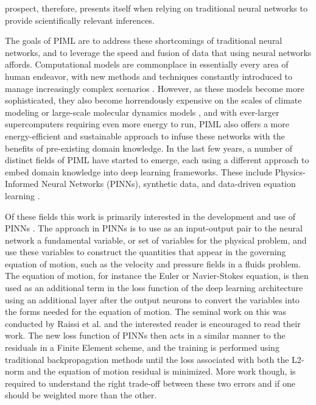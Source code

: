 \documentclass[3p]{elsarticle}
\begin{document}
prospect, therefore, presents itself when relying on traditional neural networks to provide scientifically relevant inferences. 

The goals of PIML are to address these shortcomings of traditional neural networks, and to leverage the speed and fusion of data that using neural networks affords. Computational models are commonplace in essentially every area of human endeavor, with new methods and techniques constantly introduced to manage increasingly complex scenarios \cite{raymond2014meshfree,raymond2015coupled,raymond2015estimation,raymond2016strategy,raymond2019modeling,wieghold2019detection,	raymond2020fracture}. However, as these models become more sophisticated, they also become horrendously expensive on the scales of climate modeling\cite{Harris2014623} or large-scale molecular dynamics models \cite{Meyers2006427}, and with ever-larger supercomputers requiring even more energy to run\cite{Springer2006230}, PIML also offers a more energy-efficient and sustainable approach to infuse these networks with the benefits of pre-existing domain knowledge. In the last few years, a number of distinct fields of PIML have started to emerge, each using a different approach to embed domain knowledge into deep learning frameworks. These include Physics-Informed Neural Networks (PINNs)\cite{RAISSI2019686}, synthetic data\cite{raymond2020deep}, and data-driven equation learning \cite{Zanna2020}. 

Of these fields this work is primarily interested in the development and use of PINNs \cite{GOSWAMI2020102447,HAGHIGHAT2021113552,HAGHIGHAT2021113741,HALL2021110192,HE2020103610,JIN2021109951,LIU2020113402,RAISSI2019686,WANG2021109914,YANG2021109913,ZHANG2021100220,ZOBEIRY2021104232,doi:10.1122/8.0000138}. The approach in PINNs is to use as an input-output pair to the neural network a fundamental variable, or set of variables for the physical problem, and use these variables to construct the quantities that appear in the governing equation of motion, such as the velocity and pressure fields in a fluids problem. The equation of motion, for instance the Euler or Navier-Stokes equation, is then used as an additional term in the loss function of the deep learning architecture using an additional layer after the output neurons to convert the variables into the forms needed for the equation of motion. The seminal work on this was conducted by Raissi et al. \cite{RAISSI2019686} and the interested reader is encouraged to read their work. The new loss function of PINNs then acts in a similar manner to the residuals in a Finite Element scheme, and the training is performed using traditional backpropagation methods until the loss associated with both the L2-norm and the equation of motion residual is minimized. More work though, is required to understand the right trade-off between these two errors and if one should be weighted more than the other. 
\end{document}
